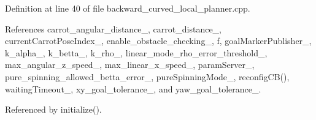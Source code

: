 Definition at line 40 of file backward\+\_\+curved\+\_\+local\+\_\+planner.\+cpp.



References carrot\+\_\+angular\+\_\+distance\+\_\+, carrot\+\_\+distance\+\_\+, current\+Carrot\+Pose\+Index\+\_\+, enable\+\_\+obstacle\+\_\+checking\+\_\+, f, goal\+Marker\+Publisher\+\_\+, k\+\_\+alpha\+\_\+, k\+\_\+betta\+\_\+, k\+\_\+rho\+\_\+, linear\+\_\+mode\+\_\+rho\+\_\+error\+\_\+threshold\+\_\+, max\+\_\+angular\+\_\+z\+\_\+speed\+\_\+, max\+\_\+linear\+\_\+x\+\_\+speed\+\_\+, param\+Server\+\_\+, pure\+\_\+spinning\+\_\+allowed\+\_\+betta\+\_\+error\+\_\+, pure\+Spinning\+Mode\+\_\+, reconfig\+C\+B(), waiting\+Timeout\+\_\+, xy\+\_\+goal\+\_\+tolerance\+\_\+, and yaw\+\_\+goal\+\_\+tolerance\+\_\+.



Referenced by initialize().


